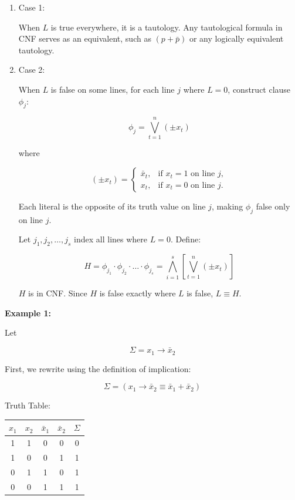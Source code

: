 \documentclass[12pt,a4paper,openany]{article}
\begin{document}
\begin{enumerate}

\item Case 1:

When $L$ is true everywhere, it is a tautology. Any tautological
formula in CNF serves as an equivalent, such as $(p + \bar{p})$ or any
logically equivalent tautology.

\item Case 2:

When $L$ is false on some lines, for each line $j$ where $L = 0$,
construct clause $\phi_j$:

\[
\phi_j = \bigvee_{t=1}^{n} (\pm x_t)
\]

where

\[
(\pm x_t) =
\begin{cases}
\bar x_t, & \text{if } x_t = 1 \text{ on line } j, \\
x_t, & \text{if } x_t = 0 \text{ on line } j.
\end{cases}
\]

Each literal is the opposite of its truth value on line $j$, making
$\phi_j$ false only on line $j$.

Let $j_1, j_2, \dots, j_s$ index all lines where $L = 0$. Define:

\[
H = \phi_{j_1} \cdot \phi_{j_2} \cdot \dots \cdot \phi_{j_s} = \bigwedge_{i=1}^{s} \left[ \bigvee_{t=1}^{n} (\pm x_t) \right]
\]

$H$ is in CNF. Since $H$ is false exactly where $L$ is false, $L \equiv H$.

\end{enumerate}

\textbf{Example 1:}

Let

\[\Sigma = x_1 \to \bar{x}_2\]

First, we rewrite using the definition of implication:

\[\Sigma = (x_1 \to \bar{x}_2 \equiv \bar{x}_1 + \bar{x}_2)\]

Truth Table:

\begin{center}
\begin{tabular}{|c|c|c|c|c|}
\hline
$x_1$ & $x_2$ & $\bar{x}_1$ & $\bar{x}_2$ & $\Sigma$ \\
\hline
1 & 1 & 0 & 0 & 0 \\
\hline
1 & 0 & 0 & 1 & 1 \\
\hline
0 & 1 & 1 & 0 & 1 \\
\hline
0 & 0 & 1 & 1 & 1 \\
\hline
\end{tabular}
\end{center}
\end{document}
